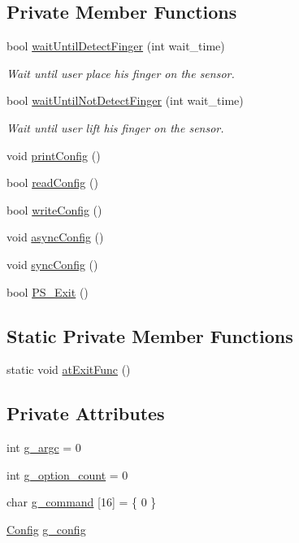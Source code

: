\subsection*{Private Member Functions}
\begin{DoxyCompactItemize}
\item 
bool \hyperlink{class_fingerprint_a959742eb41b55d7c020efb112ccd5a0f}{wait\+Until\+Detect\+Finger} (int wait\+\_\+time)
\begin{DoxyCompactList}\small\item\em Wait until user place his finger on the sensor. \end{DoxyCompactList}\item 
bool \hyperlink{class_fingerprint_a11b1faa271d7283c02c754cc4bffb8bf}{wait\+Until\+Not\+Detect\+Finger} (int wait\+\_\+time)
\begin{DoxyCompactList}\small\item\em Wait until user lift his finger on the sensor. \end{DoxyCompactList}\item 
void \hyperlink{class_fingerprint_ae0ffc91fd782dd1ab090fdd28726f911}{print\+Config} ()
\item 
bool \hyperlink{class_fingerprint_aac04dbf5582f4120838faa0c00316012}{read\+Config} ()
\item 
bool \hyperlink{class_fingerprint_a2dd5fc3b9f6486b66fdb150b070609ef}{write\+Config} ()
\item 
void \hyperlink{class_fingerprint_ad9c2578b52ab75983271ea55d402ef25}{async\+Config} ()
\item 
void \hyperlink{class_fingerprint_a23218cbe7b1fb8ebc5ea971d769a25a9}{sync\+Config} ()
\item 
bool \hyperlink{class_fingerprint_a0e9156666a243c52f3895323cae3e4df}{P\+S\+\_\+\+Exit} ()
\end{DoxyCompactItemize}
\subsection*{Static Private Member Functions}
\begin{DoxyCompactItemize}
\item 
static void \hyperlink{class_fingerprint_a39df0d3a3476373bb5f52e51c3493990}{at\+Exit\+Func} ()
\end{DoxyCompactItemize}
\subsection*{Private Attributes}
\begin{DoxyCompactItemize}
\item 
int \hyperlink{class_fingerprint_a6c26e2b5a81ca5c64c071ccb7015203a}{g\+\_\+argc} = 0
\item 
int \hyperlink{class_fingerprint_aa15d4217dbabc0f81f1cf974e9d0210e}{g\+\_\+option\+\_\+count} = 0
\item 
char \hyperlink{class_fingerprint_a3721a87997e433ce249cf39273ff7ef2}{g\+\_\+command} \mbox{[}16\mbox{]} = \{ 0 \}
\item 
\hyperlink{utils_8h_a772a20383bc9b7aed79e9cc41bf87b13}{Config} \hyperlink{class_fingerprint_a024d7d3de7d047b02358fac4625d0c6c}{g\+\_\+config}
\end{DoxyCompactItemize}


